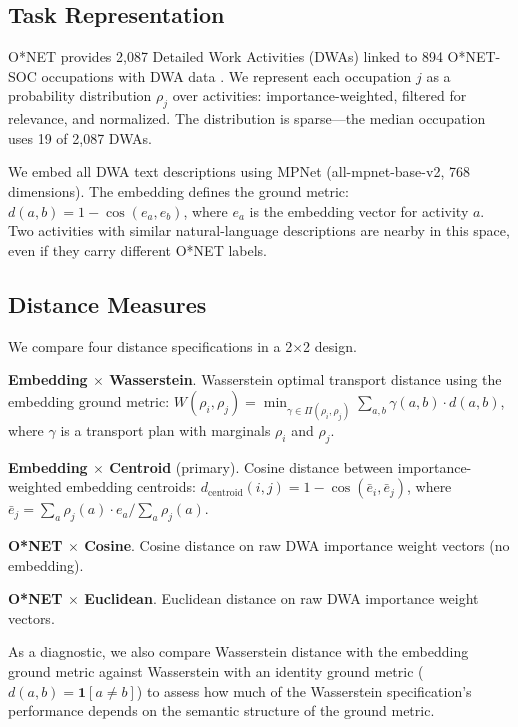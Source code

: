 \documentclass[12pt]{article}
\begin{document}
\subsection{Task Representation}
\label{subsec:task-representation}

O*NET provides 2,087 Detailed Work Activities (DWAs) linked to 894 O*NET-SOC occupations with DWA data \citep{onet2024dwa,onet2024scales}. We represent each occupation $j$ as a probability distribution $\rho_j$ over activities: importance-weighted, filtered for relevance, and normalized. The distribution is sparse---the median occupation uses 19 of 2,087 DWAs.

We embed all DWA text descriptions using MPNet (all-mpnet-base-v2, 768 dimensions). The embedding defines the ground metric: $d(a,b) = 1 - \cos(e_a, e_b)$, where $e_a$ is the embedding vector for activity $a$. Two activities with similar natural-language descriptions are nearby in this space, even if they carry different O*NET labels.


\subsection{Distance Measures}
\label{subsec:distance-design}

We compare four distance specifications in a 2$\times$2 design.

\textbf{Embedding $\times$ Wasserstein}. Wasserstein optimal transport distance using the embedding ground metric:
$W(\rho_i, \rho_j) = \min_{\gamma \in \Pi(\rho_i, \rho_j)} \sum_{a,b} \gamma(a,b) \cdot d(a,b)$,
where $\gamma$ is a transport plan with marginals $\rho_i$ and $\rho_j$.

\textbf{Embedding $\times$ Centroid} (primary). Cosine distance between importance-weighted embedding centroids:
$d_{\mathrm{centroid}}(i, j) = 1 - \cos(\bar{e}_i, \bar{e}_j)$, where $\bar{e}_j = \sum_a \rho_j(a) \cdot e_a / \sum_a \rho_j(a)$.

\textbf{O*NET $\times$ Cosine}. Cosine distance on raw DWA importance weight vectors (no embedding).

\textbf{O*NET $\times$ Euclidean}. Euclidean distance on raw DWA importance weight vectors.

As a diagnostic, we also compare Wasserstein distance with the embedding ground metric against Wasserstein with an identity ground metric ($d(a,b) = \mathbf{1}[a \neq b]$) to assess how much of the Wasserstein specification's performance depends on the semantic structure of the ground metric.
\end{document}
